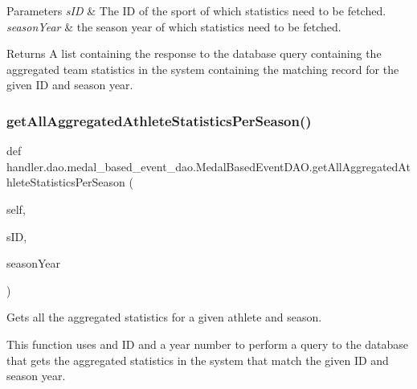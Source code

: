 \begin{DoxyParams}{Parameters}
{\em s\+ID} & The ID of the sport of which statistics need to be fetched. \\
\hline
{\em season\+Year} & the season year of which statistics need to be fetched.\\
\hline
\end{DoxyParams}
\begin{DoxyReturn}{Returns}
A list containing the response to the database query containing the aggregated team statistics in the system containing the matching record for the given ID and season year. 
\end{DoxyReturn}
\mbox{\label{classhandler_1_1dao_1_1medal__based__event__dao_1_1_medal_based_event_d_a_o_aea61ef7549c3db1d0947721ba93ec624}} 
\subsubsection{\texorpdfstring{get\+All\+Aggregated\+Athlete\+Statistics\+Per\+Season()}{getAllAggregatedAthleteStatisticsPerSeason()}}
{\footnotesize\ttfamily def handler.\+dao.\+medal\+\_\+based\+\_\+event\+\_\+dao.\+Medal\+Based\+Event\+D\+A\+O.\+get\+All\+Aggregated\+Athlete\+Statistics\+Per\+Season (\begin{DoxyParamCaption}\item[{}]{self,  }\item[{}]{s\+ID,  }\item[{}]{season\+Year }\end{DoxyParamCaption})}



Gets all the aggregated statistics for a given athlete and season. 

This function uses and ID and a year number to perform a query to the database that gets the aggregated statistics in the system that match the given ID and season year.


